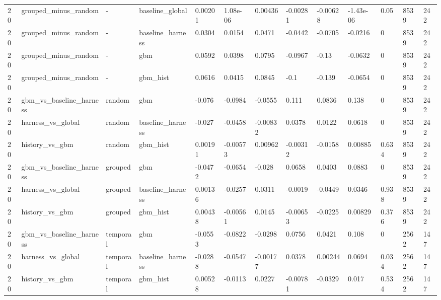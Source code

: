 \begin{tabular}{lllllllllllll}
20 & grouped\_minus\_random & - & baseline\_global & 0.00201 & 1.08e-06 & 0.00436 & -0.00281 & -0.00628 & -1.43e-06 & 0.05 & 8539 & 242 \\
20 & grouped\_minus\_random & - & baseline\_harness & 0.0304 & 0.0154 & 0.0471 & -0.0442 & -0.0705 & -0.0216 & 0 & 8539 & 242 \\
20 & grouped\_minus\_random & - & gbm & 0.0592 & 0.0398 & 0.0795 & -0.0967 & -0.13 & -0.0632 & 0 & 8539 & 242 \\
20 & grouped\_minus\_random & - & gbm\_hist & 0.0616 & 0.0415 & 0.0845 & -0.1 & -0.139 & -0.0654 & 0 & 8539 & 242 \\
20 & gbm\_vs\_baseline\_harness & random & gbm & -0.076 & -0.0984 & -0.0555 & 0.111 & 0.0836 & 0.138 & 0 & 8539 & 242 \\
20 & harness\_vs\_global & random & baseline\_harness & -0.027 & -0.0458 & -0.00832 & 0.0378 & 0.0122 & 0.0618 & 0 & 8539 & 242 \\
20 & history\_vs\_gbm & random & gbm\_hist & 0.00191 & -0.00573 & 0.00962 & -0.00312 & -0.0158 & 0.00885 & 0.634 & 8539 & 242 \\
20 & gbm\_vs\_baseline\_harness & grouped & gbm & -0.0472 & -0.0654 & -0.028 & 0.0658 & 0.0403 & 0.0883 & 0 & 8539 & 242 \\
20 & harness\_vs\_global & grouped & baseline\_harness & 0.00136 & -0.0257 & 0.0311 & -0.0019 & -0.0449 & 0.0346 & 0.938 & 8539 & 242 \\
20 & history\_vs\_gbm & grouped & gbm\_hist & 0.00438 & -0.00561 & 0.0145 & -0.00653 & -0.0225 & 0.00829 & 0.376 & 8539 & 242 \\
20 & gbm\_vs\_baseline\_harness & temporal & gbm & -0.0553 & -0.0822 & -0.0298 & 0.0756 & 0.0421 & 0.108 & 0 & 2562 & 147 \\
20 & harness\_vs\_global & temporal & baseline\_harness & -0.0288 & -0.0547 & -0.00177 & 0.0378 & 0.00244 & 0.0694 & 0.034 & 2562 & 147 \\
20 & history\_vs\_gbm & temporal & gbm\_hist & 0.00528 & -0.0113 & 0.0227 & -0.00781 & -0.0329 & 0.017 & 0.534 & 2562 & 147 \\
\bottomrule
\end{tabular}